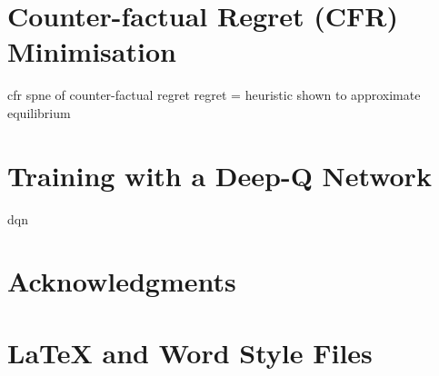 \documentclass{article}
\begin{document}
\section{Counter-factual Regret (CFR) Minimisation}

cfr
spne of counter-factual regret
regret = heuristic
shown to approximate equilibrium
\section{Training with a Deep-Q Network}

dqn


\section*{Acknowledgments}

\appendix

\section{\LaTeX{} and Word Style Files}\label{stylefiles}



\end{document}
